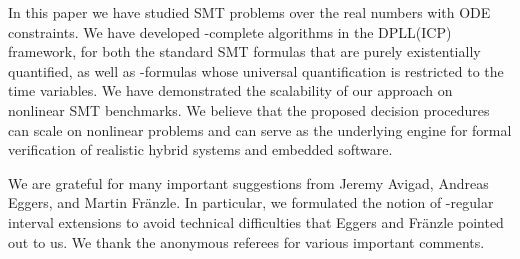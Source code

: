 \documentclass[12pt]{article}
\begin{document}
In this paper we have studied SMT problems over the real numbers with ODE constraints. We have developed -complete algorithms in the DPLL(ICP) framework, for both the standard SMT formulas that are purely existentially quantified, as well as -formulas whose universal quantification is restricted to the time variables. We have demonstrated the scalability of our approach on nonlinear SMT benchmarks. We believe that the proposed decision procedures can scale on nonlinear problems and can serve as the underlying engine for formal verification of realistic hybrid systems and embedded software.

 We are grateful for many important suggestions from Jeremy Avigad, Andreas Eggers, and Martin Fr\"anzle. In particular,  we formulated the notion of -regular interval extensions to avoid technical difficulties that Eggers and Fr\"anzle pointed out to us. We thank the anonymous referees for various important comments. 

\end{document}
